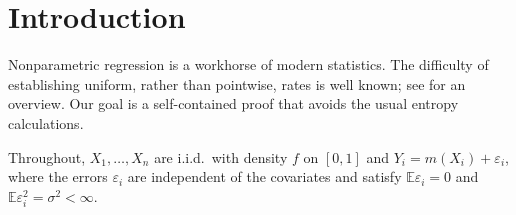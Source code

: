 \section{Introduction}
\label{sec:intro}

Nonparametric regression is a workhorse of modern statistics. The
difficulty of establishing uniform, rather than pointwise, rates is
well known; see \cite{gine2016mathematical} for an overview. Our goal is
a self-contained proof that avoids the usual entropy calculations.

Throughout, $X_1,\dots,X_n$ are i.i.d.\ with density $f$ on $[0,1]$ and
$Y_i = m(X_i) + \varepsilon_i$, where the errors $\varepsilon_i$ are
independent of the covariates and satisfy $\mathbb{E}\varepsilon_i = 0$
and $\mathbb{E}\varepsilon_i^2 = \sigma^2 < \infty$.
